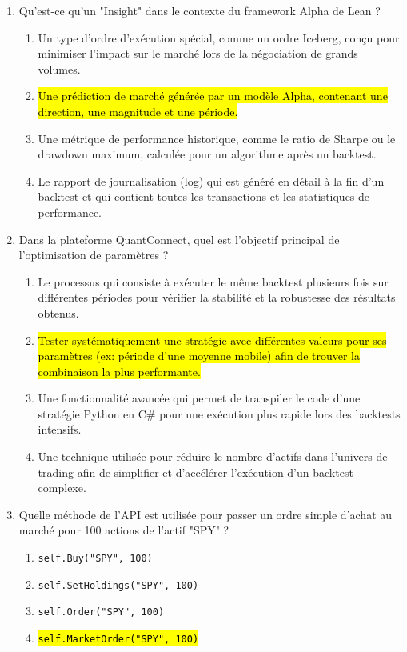 \documentclass[a4paper,12pt]{article}
\begin{document}
\begin{enumerate}
    \item Qu'est-ce qu'un "Insight" dans le contexte du framework Alpha de Lean ?
    \begin{enumerate}[label=(\Alph*)]
        \item Un type d'ordre d'exécution spécial, comme un ordre Iceberg, conçu pour minimiser l'impact sur le marché lors de la négociation de grands volumes.
        \item \hl{Une prédiction de marché générée par un modèle Alpha, contenant une direction, une magnitude et une période.}
        \item Une métrique de performance historique, comme le ratio de Sharpe ou le drawdown maximum, calculée pour un algorithme après un backtest.
        \item Le rapport de journalisation (log) qui est généré en détail à la fin d'un backtest et qui contient toutes les transactions et les statistiques de performance.
    \end{enumerate}

    \item Dans la plateforme QuantConnect, quel est l'objectif principal de l'optimisation de paramètres ?
    \begin{enumerate}[label=(\Alph*)]
        \item Le processus qui consiste à exécuter le même backtest plusieurs fois sur différentes périodes pour vérifier la stabilité et la robustesse des résultats obtenus.
        \item \hl{Tester systématiquement une stratégie avec différentes valeurs pour ses paramètres (ex: période d'une moyenne mobile) afin de trouver la combinaison la plus performante.}
        \item Une fonctionnalité avancée qui permet de transpiler le code d'une stratégie Python en C\# pour une exécution plus rapide lors des backtests intensifs.
        \item Une technique utilisée pour réduire le nombre d'actifs dans l'univers de trading afin de simplifier et d'accélérer l'exécution d'un backtest complexe.
    \end{enumerate}
    
    \item Quelle méthode de l'API est utilisée pour passer un ordre simple d'achat au marché pour 100 actions de l'actif "SPY" ?
    \begin{enumerate}[label=(\Alph*)]
        \item \texttt{self.Buy("SPY", 100)}
        \item \texttt{self.SetHoldings("SPY", 100)}
        \item \texttt{self.Order("SPY", 100)}
        \item \hl{\texttt{self.MarketOrder("SPY", 100)}}
    \end{enumerate}


\end{enumerate}
\end{document}
